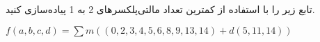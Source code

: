 تابع زیر را با استفاده از کمترین تعداد مالتی‌پلکسرهای 2 به 1 پیاده‌سازی کنید.

\begin{latin}
	$f(a,b,c,d)=\sum m((0, 2, 3, 4, 5, 6, 8, 9, 13, 14) + d(5, 11, 14))$
\end{latin}